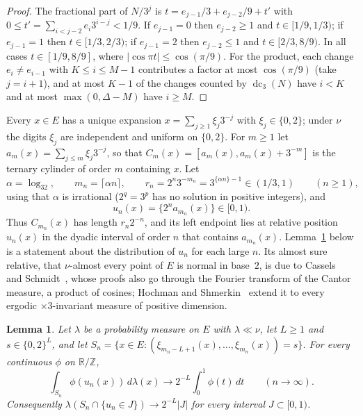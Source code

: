 \documentclass[11pt]{amsart}
\newtheorem{lemma}[theorem]{Lemma}
\theoremstyle{remark}
\newcommand{\R}{\mathbb R}
\newcommand{\Z}{\mathbb Z}
\DeclareMathOperator{\dc}{dc}
\begin{document}
\begin{proof}
The fractional part of $N/3^j$ is $t=e_{j-1}/3+e_{j-2}/9+t'$ with $0\le t'=\sum_{i<j-2}e_i3^{i-j}<1/9$. If $e_{j-1}=0$ then $e_{j-2}\ge1$ and $t\in[1/9,1/3)$; if $e_{j-1}=1$ then $t\in[1/3,2/3)$; if $e_{j-1}=2$ then $e_{j-2}\le1$ and $t\in[2/3,8/9)$. In all cases $t\in[1/9,8/9]$, where $|\cos\pi t|\le\cos(\pi/9)$. For the product, each change $e_i\ne e_{i-1}$ with $K\le i\le M-1$ contributes a factor at most $\cos(\pi/9)$ (take $j=i+1$), and at most $K-1$ of the changes counted by $\dc_3(N)$ have $i<K$ and at most $\max(0,\Delta-M)$ have $i\ge M$.
\end{proof}

Every $x\in E$ has a unique expansion $x=\sum_{j\ge1}\xi_j3^{-j}$ with $\xi_j\in\{0,2\}$; under $\nu$ the digits $\xi_j$ are independent and uniform on $\{0,2\}$. For $m\ge1$ let $a_m(x)=\sum_{j\le m}\xi_j3^{-j}$, so that $C_m(x)=[a_m(x),a_m(x)+3^{-m}]$ is the ternary cylinder of order $m$ containing $x$. Let
\[
\alpha=\log_32,\qquad m_n=\lceil\alpha n\rceil,\qquad r_n=2^n3^{-m_n}=3^{\{\alpha n\}-1}\in(1/3,1)\qquad(n\ge1),
\]
using that $\alpha$ is irrational ($2^q=3^p$ has no solution in positive integers), and
\[
u_n(x)=\{2^na_{m_n}(x)\}\in[0,1).
\]
Thus $C_{m_n}(x)$ has length $r_n2^{-n}$, and its left endpoint lies at relative position $u_n(x)$ in the dyadic interval of order $n$ that contains $a_{m_n}(x)$. Lemma~\ref{lem:mixing} below is a statement about the distribution of $u_n$ for each large $n$. Its almost sure relative, that $\nu$-almost every point of $E$ is normal in base~$2$, is due to Cassels~\cite{Cassels} and Schmidt~\cite{Schmidt}, whose proofs also go through the Fourier transform of the Cantor measure, a product of cosines; Hochman and Shmerkin~\cite{HochmanShmerkin} extend it to every ergodic $\times3$-invariant measure of positive dimension.

\begin{lemma}\label{lem:mixing}
Let $\lambda$ be a probability measure on $E$ with $\lambda\ll\nu$, let $L\ge1$ and $s\in\{0,2\}^L$, and let $S_n=\{x\in E:(\xi_{m_n-L+1}(x),\dots,\xi_{m_n}(x))=s\}$. For every continuous $\phi$ on $\R/\Z$,
\[
\int_{S_n}\phi(u_n(x))\,d\lambda(x)\longrightarrow2^{-L}\int_0^1\phi(t)\,dt\qquad(n\to\infty).
\]
Consequently $\lambda(S_n\cap\{u_n\in J\})\to2^{-L}|J|$ for every interval $J\subset[0,1)$.
\end{lemma}
\end{document}

